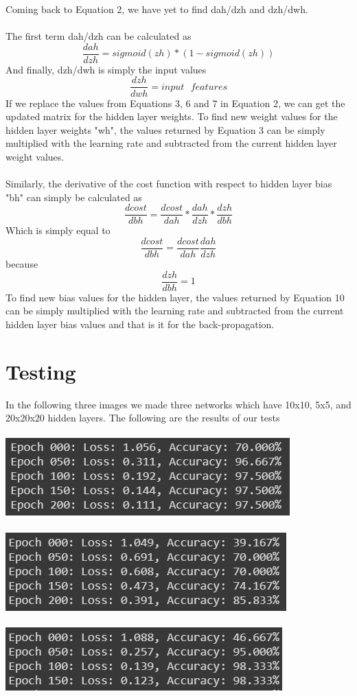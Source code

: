 \documentclass[11pt]{article}
\theoremstyle{definition}
\begin{document}
Coming back to Equation 2, we have yet to find dah/dzh and dzh/dwh.\\\\
The first term dah/dzh can be calculated as
\begin{equation}
\frac{dah}{dzh}=sigmoid(zh)*(1-sigmoid(zh))
\end{equation}
And finally, dzh/dwh is simply the input values
\begin{equation}
\frac{dzh}{dwh}=input\textrm{ }features
\end{equation}
If we replace the values from Equations 3, 6 and 7 in Equation 2, we can get the updated matrix for the hidden layer weights. To find new weight values for the hidden layer weights "wh", the values returned by Equation 3 can be simply multiplied with the learning rate and subtracted from the current hidden layer weight values.\\\\
Similarly, the derivative of the cost function with respect to hidden layer bias "bh" can simply be calculated as
\begin{equation}
\frac{dcost}{dbh}=\frac{dcost}{dah}*\frac{dah}{dzh}*\frac{dzh}{dbh}
\end{equation}
Which is simply equal to
\begin{equation}
\frac{dcost}{dbh}=\frac{dcost}{dah}\frac{dah}{dzh}
\end{equation}
because
\begin{equation}
\frac{dzh}{dbh}=1
\end{equation}
To find new bias values for the hidden layer, the values returned by Equation 10 can be simply multiplied with the learning rate and subtracted from the current hidden layer bias values and that is it for the back-propagation.

\section{Testing}
In the following three images we made three networks which have 10x10, 5x5, and 20x20x20 hidden layers. The following are the results of our tests\\\\
\includegraphics[scale=1]{image4.PNG}\\\\
\includegraphics[scale=1]{image5.PNG}\\\\
\includegraphics[scale=1]{image6.PNG}
\end{document}
